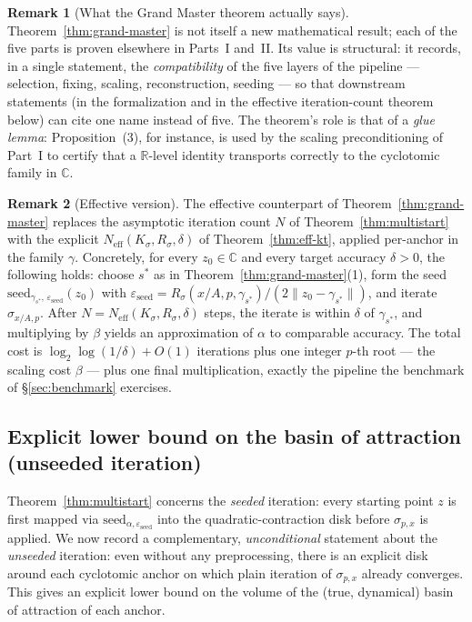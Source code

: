 \documentclass[11pt,a4paper]{article}
\theoremstyle{definition}
\newtheorem{remark}{Remark}[section]
\begin{document}
\begin{remark}[What the Grand Master theorem actually says]
Theorem~\ref{thm:grand-master} is not itself a new mathematical result; each of the five parts is proven elsewhere in Parts~I and~II. Its value is structural: it records, in a single statement, the \emph{compatibility} of the five layers of the pipeline --- selection, fixing, scaling, reconstruction, seeding --- so that downstream statements (in the formalization and in the effective iteration-count theorem below) can cite one name instead of five. The theorem's role is that of a \emph{glue lemma}: Proposition~(3), for instance, is used by the scaling preconditioning of Part~I to certify that a $\mathbb{R}$-level identity transports correctly to the cyclotomic family in $\mathbb{C}$.
\end{remark}

\begin{remark}[Effective version]
The effective counterpart of Theorem~\ref{thm:grand-master} replaces the asymptotic iteration count $N$ of Theorem~\ref{thm:multistart} with the explicit $N_{\mathrm{eff}}(K_\sigma, R_\sigma, \delta)$ of Theorem~\ref{thm:eff-kt}, applied per-anchor in the family $\gamma$. Concretely, for every $z_0 \in \mathbb{C}$ and every target accuracy $\delta > 0$, the following holds: choose $s^\ast$ as in Theorem~\ref{thm:grand-master}(1), form the seed $\mathrm{seed}_{\gamma_{s^\ast},\,\varepsilon_{\mathrm{seed}}}(z_0)$ with $\varepsilon_{\mathrm{seed}} = R_\sigma(x/A, p, \gamma_{s^\ast})/(2\|z_0 - \gamma_{s^\ast}\|)$, and iterate $\sigma_{x/A, p}$. After $N = N_{\mathrm{eff}}(K_\sigma, R_\sigma, \delta)$ steps, the iterate is within $\delta$ of $\gamma_{s^\ast}$, and multiplying by $\beta$ yields an approximation of $\alpha$ to comparable accuracy. The total cost is $\log_2 \log(1/\delta) + O(1)$ iterations plus one integer $p$-th root --- the scaling cost $\beta$ --- plus one final multiplication, exactly the pipeline the benchmark of \S\ref{sec:benchmark} exercises.
\end{remark}

\subsection{Explicit lower bound on the basin of attraction (unseeded iteration)}
\label{sec:basin-bound}

Theorem~\ref{thm:multistart} concerns the \emph{seeded} iteration: every starting point $z$ is first mapped via $\mathrm{seed}_{\alpha,\varepsilon_{\mathrm{seed}}}$ into the quadratic-contraction disk before $\sigma_{p,x}$ is applied. We now record a complementary, \emph{unconditional} statement about the \emph{unseeded} iteration: even without any preprocessing, there is an explicit disk around each cyclotomic anchor on which plain iteration of $\sigma_{p,x}$ already converges. This gives an explicit lower bound on the volume of the (true, dynamical) basin of attraction of each anchor.
\end{document}
